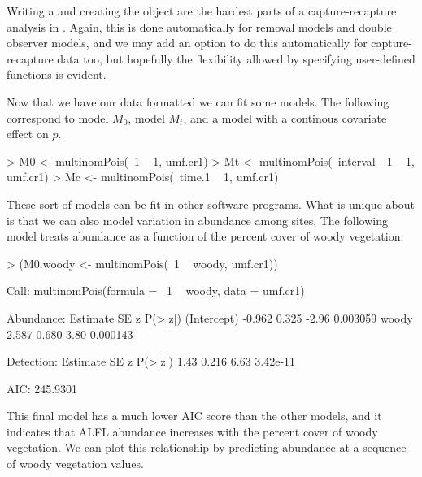 \documentclass[a4paper]{article}
\renewenvironment{Schunk}{\vspace{\topsep}}{\vspace{\topsep}}
\begin{document}
Writing a  and creating the  object are
the hardest parts of a capture-recapture analysis in
. Again, this is done automatically for removal models
and double observer models, and we may add an option to do this
automatically for capture-recapture data too, but hopefully
the flexibility allowed by specifying user-defined
functions is evident. %

Now that we have our data formatted we can fit some models. The
following correspond to model $M_0$, model $M_t$, and a model with a
continous covariate effect on $p$.


\begin{Schunk}
\begin{Sinput}
> M0 <- multinomPois(~1 ~ 1, umf.cr1)
> Mt <- multinomPois(~interval - 1 ~ 1, umf.cr1)
> Mc <- multinomPois(~time.1 ~ 1, umf.cr1)
\end{Sinput}
\end{Schunk}

These sort of models can be fit in other software programs. What is
unique about  is that we can also model variation in
abundance among sites. The following model treats abundance as
a function of the percent cover of woody vegetation.

\begin{Schunk}
\begin{Sinput}
> (M0.woody <- multinomPois(~1 ~ woody, umf.cr1))
\end{Sinput}
\begin{Soutput}
Call:
multinomPois(formula = ~1 ~ woody, data = umf.cr1)

Abundance:
            Estimate    SE     z  P(>|z|)
(Intercept)   -0.962 0.325 -2.96 0.003059
woody          2.587 0.680  3.80 0.000143

Detection:
 Estimate    SE    z  P(>|z|)
     1.43 0.216 6.63 3.42e-11

AIC: 245.9301 
\end{Soutput}
\end{Schunk}


This final model has a much lower AIC score than the other models, and
it indicates
that ALFL abundance increases with the percent cover
of woody vegetation. We can plot this relationship by predicting
abundance at a sequence of woody vegetation values.
\end{document}
